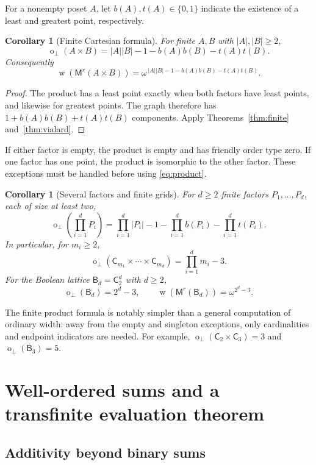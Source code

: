 \documentclass[11pt,a4paper]{article}
\newtheorem{corollary}[theorem]{Corollary}
\theoremstyle{definition}
\theoremstyle{remark}
\newcommand{\fot}{\operatorname{o}_{\perp}}
\newcommand{\wid}{\operatorname{w}}
\newcommand{\Mr}{\mathsf{M}^{r}}
\newcommand{\CA}{\mathsf{C}}
\newcommand{\bool}{\mathsf{B}}
\begin{document}
For a nonempty poset $A$, let $b(A),t(A)\in\{0,1\}$ indicate the existence
of a least and greatest point, respectively.

\begin{corollary}[Finite Cartesian formula]\label{cor:product}
For finite $A,B$ with $|A|,|B|\ge2$,
\begin{equation}\label{eq:product}
 \boxed{\fot(A\times B)=|A||B|-1-b(A)b(B)-t(A)t(B).}
\end{equation}
Consequently
\[
 \wid(\Mr(A\times B))
   =\omega^{\,|A||B|-1-b(A)b(B)-t(A)t(B)}.
\]
\end{corollary}

\begin{proof}
The product has a least point exactly when both factors have least points,
and likewise for greatest points. The graph therefore has
$1+b(A)b(B)+t(A)t(B)$ components. Apply Theorems~\ref{thm:finite}
and~\ref{thm:vialard}.
\end{proof}

If either factor is empty, the product is empty and has friendly order type
zero. If one factor has one point, the product is isomorphic to the other
factor. These exceptions must be handled before using \eqref{eq:product}.

\begin{corollary}[Several factors and finite grids]
For $d\ge2$ finite factors $P_1,\ldots,P_d$, each of size at least two,
\[
 \fot\!\left(\prod_{i=1}^dP_i\right)
 =\prod_{i=1}^d|P_i|-1-\prod_{i=1}^db(P_i)-\prod_{i=1}^dt(P_i).
\]
In particular, for $m_i\ge2$,
\[
 \fot(\CA_{m_1}\times\cdots\times\CA_{m_d})=\prod_{i=1}^dm_i-3.
\]
For the Boolean lattice $\bool_d=\CA_2^d$ with $d\ge2$,
\[
 \fot(\bool_d)=2^d-3,\qquad
 \wid(\Mr(\bool_d))=\omega^{2^d-3}.
\]
\end{corollary}

The finite product formula is notably simpler than a general computation
of ordinary width: away from the empty and singleton exceptions, only
cardinalities and endpoint indicators are needed. For example,
$\fot(\CA_2\times\CA_3)=3$ and $\fot(\bool_3)=5$.

\section{Well-ordered sums and a transfinite evaluation theorem}

\subsection{Additivity beyond binary sums}
\end{document}
